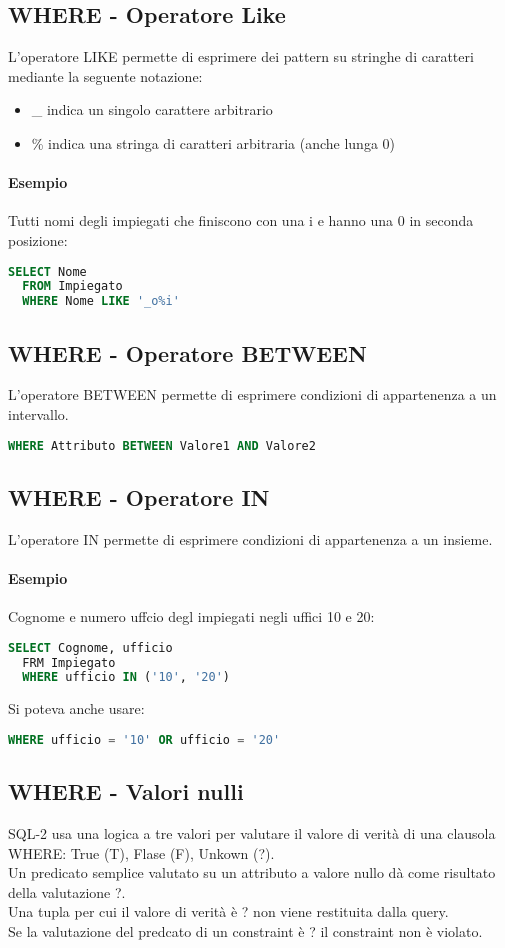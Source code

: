 \subsection{WHERE - Operatore Like}
L'operatore LIKE permette di esprimere dei pattern su stringhe di
caratteri mediante la seguente notazione:
\begin{itemize}
  \item \_ indica un singolo carattere arbitrario
  \item \% indica una stringa di caratteri arbitraria (anche lunga 0)
\end{itemize}
\paragraph*{Esempio} Tutti nomi degli impiegati che finiscono con una i
e hanno una 0 in seconda posizione:
\begin{lstlisting}[language=SQL]
  SELECT Nome
  FROM Impiegato
  WHERE Nome LIKE '_o%i'
\end{lstlisting}
\subsection{WHERE - Operatore BETWEEN}
L'operatore BETWEEN permette di esprimere condizioni di appartenenza
a un intervallo.
\begin{lstlisting}[language=SQL]
  WHERE Attributo BETWEEN Valore1 AND Valore2
\end{lstlisting}
\subsection{WHERE - Operatore IN}
L'operatore IN permette di esprimere condizioni di appartenenza 
a un insieme.
\paragraph*{Esempio} Cognome e numero uffcio degl impiegati negli
uffici 10 e 20:
\begin{lstlisting}[language=SQL]
  SELECT Cognome, ufficio
  FRM Impiegato
  WHERE ufficio IN ('10', '20')
\end{lstlisting}
Si poteva anche usare:
\begin{lstlisting}[language=SQL]
  WHERE ufficio = '10' OR ufficio = '20'
\end{lstlisting}
\subsection{WHERE - Valori nulli}
SQL-2 usa una logica a tre valori per valutare il valore di verità
di una clausola WHERE: True (T), Flase (F), Unkown (?).\\
Un predicato semplice valutato su un attributo a valore nullo dà come
risultato della valutazione ?.\\
Una tupla per cui il valore di verità è ? non viene restituita dalla query.\\
Se la valutazione del predcato di un constraint è ? il constraint non
è violato.\\
